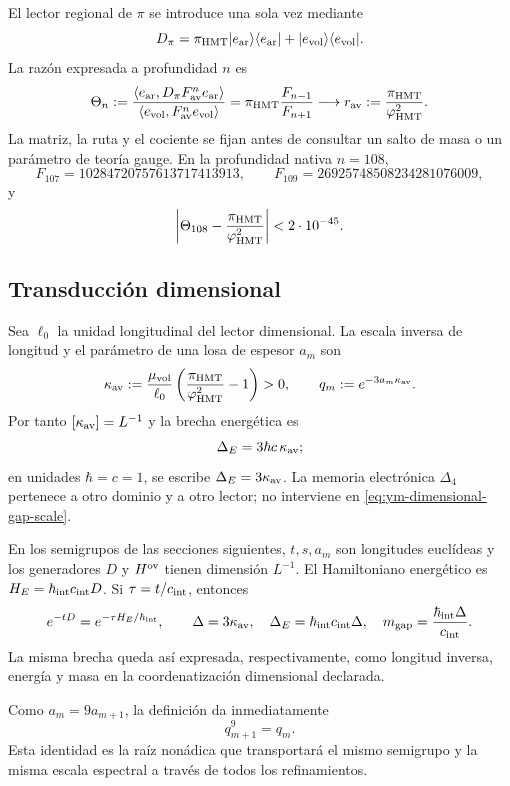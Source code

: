 El lector regional de \(\pi\) se introduce una sola vez mediante
\begin{equation}
 D_\pi
 =\pi_{\rm HMT}|e_{\rm ar}\rangle\langle e_{\rm ar}|
  +|e_{\rm vol}\rangle\langle e_{\rm vol}|.
 \label{eq:ym-pi-regional-reader}
\end{equation}
La razón expresada a profundidad \(n\) es
\begin{equation}
 \Theta_n
 :=\frac{\langle e_{\rm ar},D_\pi F_{\rm av}^{n}e_{\rm ar}\rangle}
 {\langle e_{\rm vol},F_{\rm av}^{n}e_{\rm vol}\rangle}
 =\pi_{\rm HMT}\frac{F_{n-1}}{F_{n+1}}
 \longrightarrow
 r_{\rm av}:=\frac{\pi_{\rm HMT}}{\varphi_{\rm HMT}^{2}}.
 \label{eq:ym-target-free-av-limit}
\end{equation}
La matriz, la ruta y el cociente se fijan antes de consultar un salto de
masa o un parámetro de teoría gauge. En la profundidad nativa \(n=108\),
\begin{equation}
 F_{107}=10284720757613717413913,
 \qquad
 F_{109}=26925748508234281076009,
 \label{eq:ym-fibonacci-107-109}
\end{equation}
y
\begin{equation}
 \left|\Theta_{108}
 -\frac{\pi_{\rm HMT}}{\varphi_{\rm HMT}^{2}}\right|
 <2\cdot10^{-45}.
 \label{eq:ym-av-depth-108-error}
\end{equation}

\subsection{Transducción dimensional}

Sea \(\ell_0\) la unidad longitudinal del lector dimensional. La escala
inversa de longitud y el parámetro de una losa de espesor \(a_m\) son
\begin{equation}
 \kappa_{\rm av}
 :=\frac{\mu_{\rm vol}}{\ell_0}
 \left(\frac{\pi_{\rm HMT}}{\varphi_{\rm HMT}^{2}}-1\right)>0,
 \qquad
 q_m:=e^{-3a_m\kappa_{\rm av}}.
 \label{eq:ym-dimensional-gap-scale}
\end{equation}
Por tanto \([\kappa_{\rm av}]=L^{-1}\) y la brecha energética es
\begin{equation}
 \Delta_E=3\hbar c\,\kappa_{\rm av};
 \label{eq:ym-energy-gap-units}
\end{equation}
en unidades \(\hbar=c=1\), se escribe \(\Delta_E=3\kappa_{\rm av}\).
La memoria electrónica \(\Delta_4\) pertenece a otro dominio y a otro
lector; no interviene en \eqref{eq:ym-dimensional-gap-scale}.

En los semigrupos de las secciones siguientes, \(t,s,a_m\) son
longitudes euclídeas y los generadores \(D\) y \(H^{\rm ov}\) tienen
dimensión \(L^{-1}\). El Hamiltoniano energético es
\(H_E=\hbar_{\rm int}c_{\rm int}D\). Si
\(\tau=t/c_{\rm int}\), entonces
\[
 e^{-tD}=e^{-\tau H_E/\hbar_{\rm int}},\qquad
 \Delta=3\kappa_{\rm av},\quad
 \Delta_E=\hbar_{\rm int}c_{\rm int}\Delta,\quad
 m_{\rm gap}=\frac{\hbar_{\rm int}\Delta}{c_{\rm int}}.
\]
La misma brecha queda así expresada, respectivamente, como longitud
inversa, energía y masa en la coordenatización dimensional declarada.

Como \(a_m=9a_{m+1}\), la definición da inmediatamente
\begin{equation}
 q_{m+1}^{9}=q_m.
 \label{eq:ym-nonadic-gap-root}
\end{equation}
Esta identidad es la raíz nonádica que transportará el mismo semigrupo y la
misma escala espectral a través de todos los refinamientos.
